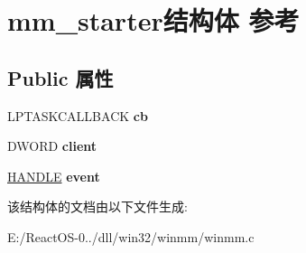 \hypertarget{structmm__starter}{}\section{mm\+\_\+starter结构体 参考}
\label{structmm__starter}
\subsection*{Public 属性}
\begin{DoxyCompactItemize}
\item 
\mbox{\label{structmm__starter_a5d2a49cf52eb1f466b99d065838949de}} 
L\+P\+T\+A\+S\+K\+C\+A\+L\+L\+B\+A\+CK {\bfseries cb}
\item 
\mbox{\label{structmm__starter_a14449fb516768c28d69811b86878bd7d}} 
D\+W\+O\+RD {\bfseries client}
\item 
\mbox{\label{structmm__starter_a7828d173be706c201f087abfba3e115a}} 
\hyperlink{interfacevoid}{H\+A\+N\+D\+LE} {\bfseries event}
\end{DoxyCompactItemize}


该结构体的文档由以下文件生成\+:\begin{DoxyCompactItemize}
\item 
E\+:/\+React\+O\+S-\/0../dll/win32/winmm/winmm.\+c\end{DoxyCompactItemize}
